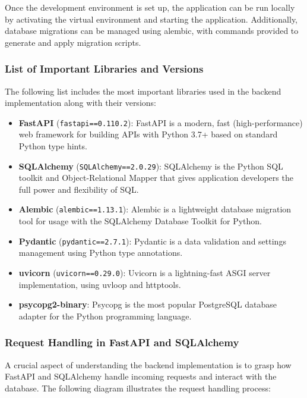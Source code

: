 Once the development environment is set up, the application can be run locally by activating the virtual environment and starting the application. Additionally, database migrations can be managed using alembic, with commands provided to generate and apply migration scripts.

\subsubsection{List of Important Libraries and Versions}

The following list includes the most important libraries used in the backend implementation along with their versions:

\begin{itemize}
    \item \textbf{FastAPI} (\texttt{fastapi==0.110.2}): FastAPI is a modern, fast (high-performance) web framework for building APIs with Python 3.7+ based on standard Python type hints.

    \item \textbf{SQLAlchemy} (\texttt{SQLAlchemy==2.0.29}): SQLAlchemy is the Python SQL toolkit and Object-Relational Mapper that gives application developers the full power and flexibility of SQL.

    \item \textbf{Alembic} (\texttt{alembic==1.13.1}): Alembic is a lightweight database migration tool for usage with the SQLAlchemy Database Toolkit for Python.

    \item \textbf{Pydantic} (\texttt{pydantic==2.7.1}): Pydantic is a data validation and settings management using Python type annotations.

    \item \textbf{uvicorn} (\texttt{uvicorn==0.29.0}): Uvicorn is a lightning-fast ASGI server implementation, using uvloop and httptools.

    \item \textbf{psycopg2-binary}: Psycopg is the most popular PostgreSQL database adapter for the Python programming language.
\end{itemize}

\subsubsection{Request Handling in FastAPI and SQLAlchemy}

A crucial aspect of understanding the backend implementation is to grasp how FastAPI and SQLAlchemy handle incoming requests and interact with the database. The following diagram illustrates the request handling process:

